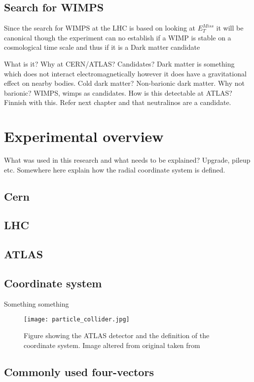 \subsection{Search for WIMPS}
Since the search for WIMPS at the LHC is based on looking at $E_T^{Miss}$ it will be canonical though the experiment can no establish if a WIMP is stable on a cosmological time scale and thus if it is a Dark matter candidate \citep{CERN-PH-EP-2012-210}


What is it? Why at CERN/ATLAS? Candidates?
Dark matter is something which does not interact electromagnetically however it does have a gravitational effect on nearby bodies.
Cold dark matter?
Non-barionic dark matter. Why not barionic?
WIMPS, wimps as candidates.
How is this detectable at ATLAS? Finnish with this. Refer next chapter and that neutralinos are a candidate.

\newpage
\section{Experimental overview}
What was used in this research and what needs to be explained? Upgrade, pileup etc.
Somewhere here explain how the radial coordinate system is defined.
\subsection{Cern}
\subsection{LHC}
\subsection{ATLAS}
\subsection{Coordinate system}
Something something

\begin{figure}[H]
\begin{center}
\texttt{[image: particle\_collider.jpg]}
\label{fig:coordinatesystem}
\caption{Figure showing the ATLAS detector and the definition of the coordinate system. Image altered from original taken from\citep{coordimage}}
\end{center}
\end{figure}



\subsection{Commonly used four-vectors}

